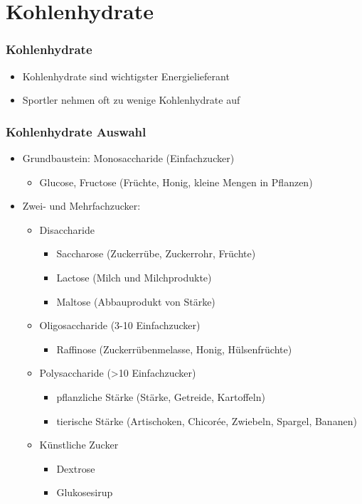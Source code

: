 \documentclass[ngerman, aspectratio=169]{beamer}
\begin{document}
\section{Kohlenhydrate}
\begin{frame}
  \frametitle{Kohlenhydrate}
  \begin{itemize}
  \item Kohlenhydrate sind wichtigster Energielieferant
  \item Sportler nehmen oft zu wenige Kohlenhydrate auf
  \end{itemize}
\end{frame}

\begin{frame}
  \frametitle{Kohlenhydrate Auswahl}
  \begin{itemize}
  \item Grundbaustein: Monosaccharide (Einfachzucker)
    \begin{itemize}
    \item Glucose, Fructose (Früchte, Honig, kleine Mengen in Pflanzen)
    \end{itemize}
  \item Zwei- und Mehrfachzucker:
    \begin{itemize}
    \item Disaccharide
      \begin{itemize}
      \item Saccharose (Zuckerrübe, Zuckerrohr, Früchte)
      \item Lactose (Milch und Milchprodukte)
      \item Maltose (Abbauprodukt von Stärke)
      \end{itemize}
    \item Oligosaccharide (3-10 Einfachzucker)
      \begin{itemize}
      \item Raffinose (Zuckerrübenmelasse, Honig, Hülsenfrüchte)
      \end{itemize}
    \item Polysaccharide (>10 Einfachzucker)
      \begin{itemize}
      \item pflanzliche Stärke (Stärke, Getreide, Kartoffeln)
      \item tierische Stärke (Artischoken, Chicorée, Zwiebeln, Spargel, Bananen)
      \end{itemize}
    \item Künstliche Zucker
      \begin{itemize}
      \item Dextrose
      \item Glukosesirup
      \end{itemize}




    \end{itemize}

  \end{itemize}
\end{frame}
\end{document}
